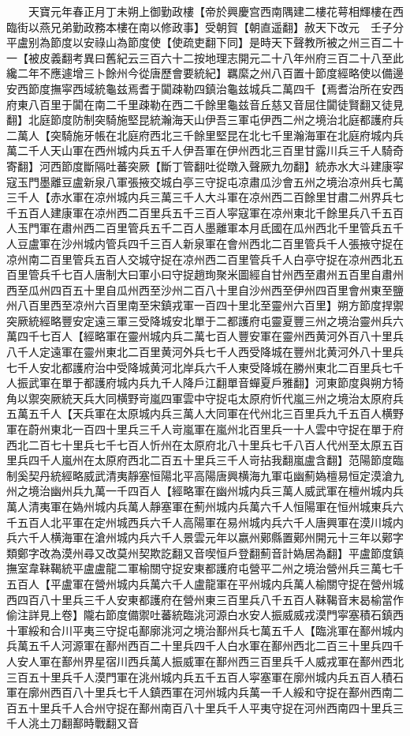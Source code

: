 　　天寶元年春正月丁未朔上御勤政樓【帝於興慶宫西南隅建二樓花萼相輝樓在西臨街以燕兄弟勤政務本樓在南以修政事】受朝賀【朝直遥翻】赦天下改元　壬子分平盧别為節度以安祿山為節度使【使疏吏翻下同】是時天下聲教所被之州三百二十一【被皮義翻考異曰舊紀云三百六十二按地理志開元二十八年州府三百二十八至此纔二年不應遽增三卜餘州今從唐歷會要統紀】羈縻之州八百置十節度經略使以備邊安西節度撫寜西域統龜兹焉耆于闐疎勒四鎮治龜兹城兵二萬四千【焉耆治所在安西府東八百里于闐在南二千里疎勒在西二千餘里龜兹音丘慈又音屈住闐徒賢翻又徒見翻】北庭節度防制突騎施堅昆統瀚海天山伊吾三軍屯伊西二州之境治北庭都護府兵二萬人【突騎施牙帳在北庭府西北三千餘里堅昆在北七千里瀚海軍在北庭府城内兵萬二千人天山軍在西州城内兵五千人伊吾軍在伊州西北三百里甘露川兵三千人騎奇寄翻】河西節度斷隔吐蕃突厥【斷丁管翻吐從暾入聲厥九勿翻】統赤水大斗建康寜寇玉門墨離豆盧新泉八軍張掖交城白亭三守捉屯凉肅瓜沙會五州之境治凉州兵七萬三千人【赤水軍在凉州城内兵三萬三千人大斗軍在凉州西二百餘里甘肅二州界兵七千五百人建康軍在凉州西二百里兵五千三百人寜寇軍在凉州東北千餘里兵八千五百人玉門軍在肅州西二百里管兵五千二百人墨離軍本月氐國在瓜州西北千里管兵五千人豆盧軍在沙州城内管兵四千三百人新泉軍在會州西北二百里管兵千人張掖守捉在凉州南二百里管兵五百人交城守捉在凉州西二百里管兵千人白亭守捉在凉州西北五百里管兵千七百人唐制大曰軍小曰守捉趙珣聚米圖經自甘州西至肅州五百里自肅州西至瓜州四百五十里自瓜州西至沙州二百八十里自沙州西至伊州四百里會州東至鹽州八百里西至凉州六百里南至宋鎮戎軍一百四十里北至靈州六百里】朔方節度捍禦突厥統經略豐安定遠三軍三受降城安北單于二都護府屯靈夏豐三州之境治靈州兵六萬四千七百人【經略軍在靈州城内兵二萬七百人豐安軍在靈州西黄河外百八十里兵八千人定遠軍在靈州東北二百里黄河外兵七千人西受降城在豐州北黄河外八十里兵七千人安北都護府治中受降城黄河北岸兵六千人東受降城在勝州東北二百里兵七千人振武軍在單于都護府城内兵九千人降戶江翻單音蟬夏戶雅翻】河東節度與朔方犄角以禦突厥統天兵大同横野岢嵐四軍雲中守捉屯太原府忻代嵐三州之境治太原府兵五萬五千人【天兵軍在太原城内兵三萬人大同軍在代州北三百里兵九千五百人横野軍在蔚州東北一百四十里兵三千人岢嵐軍在嵐州北百里兵一十人雲中守捉在單于府西北二百七十里兵七千七百人忻州在太原府北八十里兵七千八百人代州至太原五百里兵四千人嵐州在太原府西北二百五十里兵三千人岢拈我翻嵐盧含翻】范陽節度臨制奚契丹統經略威武清夷靜塞恒陽北平高陽唐興横海九軍屯幽薊媯檀易恒定漠滄九州之境治幽州兵九萬一千四百人【經略軍在幽州城内兵三萬人威武軍在檀州城内兵萬人清夷軍在媯州城内兵萬人靜塞軍在薊州城内兵萬六千人恒陽軍在恒州城東兵六千五百人北平軍在定州城西兵六千人高陽軍在易州城内兵六千人唐興軍在漠川城内兵六千人横海軍在滄州城内兵六千人景雲元年以嬴州鄚縣置鄚州開元十三年以鄚字類鄭字改為漠州尋又改莫州契欺訖翻又音喫恒戶登翻薊音計媯居為翻】平盧節度鎮撫室韋靺鞨統平盧盧龍二軍榆關守捉安東都護府屯營平二州之境治營州兵三萬七千五百人【平盧軍在營州城内兵萬六千人盧龍軍在平州城内兵萬人榆關守捉在營州城西四百八十里兵三千人安東都護府在營州東三百里兵八千五百人靺鞨音末曷榆當作偷注詳見上卷】隴右節度備禦吐蕃統臨洮河源白水安人振威威戎漠門寜塞積石鎮西十軍綏和合川平夷三守捉屯鄯廓洮河之境治鄯州兵七萬五千人【臨洮軍在鄯州城内兵萬五千人河源軍在鄯州西百二十里兵四千人白水軍在鄯州西北二百三十里兵四千人安人軍在鄯州界星宿川西兵萬人振威軍在鄯州西三百里兵千人威戎軍在鄯州西北三百五十里兵千人漠門軍在洮州城内兵五千五百人寜塞軍在廓州城内兵五百人積石軍在廓州西百八十里兵七千人鎮西軍在河州城内兵萬一千人綏和守捉在鄯州西南二百五十里兵千人合州守捉在鄯州南百八十里兵千人平夷守捉在河州西南四十里兵三千人洮土刀翻鄯時戰翻又音